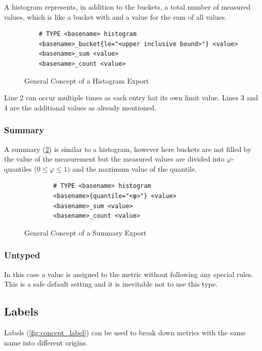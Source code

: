 A histogram represents, in addition to the buckets, a total number of measured values, which is like a bucket with  and a value for the sum of all values.

\begin{figure}[H]
	\begin{verbatim}
	# TYPE <basename> histogram
	<basename>_bucket{le="<upper inclusive bound>"} <value>
	<basename>_sum <value>
	<basename>_count <value>
	\end{verbatim}
	\caption{General Concept of a Histogram Export}
	\label{fig:concept_histogramm}
\end{figure}

Line 2 can occur multiple times as each entry hat its own limit value. Lines 3 and 4 are the additional values as already mentioned.

\subsubsection{Summary}

A summary (\cref{fig:concept_summary}) is similar to a histogram, however here buckets are not filled by the value of the measurement but the measured values are divided into $\varphi$-quantiles ($0 \le \varphi \le 1)$ and the maximum value of the quantile.

\begin{figure}[!ht]
	\begin{verbatim}
		# TYPE <basename> histogram
		<basename>{quantile="<φ>"} <value>
		<basename>_sum <value>
		<basename>_count <value>
	\end{verbatim}
	\caption{General Concept of a Summary Export}
	\label{fig:concept_summary}
\end{figure}

\subsubsection{Untyped}

In this case a value is assigned to the metric without following any special rules. This is a safe default setting and it is inevitable not to use this type.

\subsection{Labels}

Labels (\cref{fig:concept_label}) can be used to break down metrics with the same name into different origins. 

